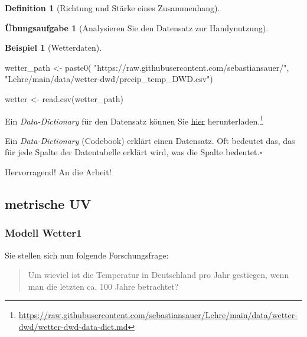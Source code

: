 \documentclass[
  a4paper,
  DIV=11]{scrreprt}
\newenvironment{Shaded}{\begin{snugshade}}{\end{snugshade}}
\newcommand{\FunctionTok}[1]{\textcolor[rgb]{0.28,0.35,0.67}{#1}}
\newcommand{\NormalTok}[1]{\textcolor[rgb]{0.00,0.23,0.31}{#1}}
\newcommand{\OtherTok}[1]{\textcolor[rgb]{0.00,0.23,0.31}{#1}}
\newcommand{\StringTok}[1]{\textcolor[rgb]{0.13,0.47,0.30}{#1}}
\theoremstyle{definition}
\newtheorem{exercise}{Übungsaufgabe}[chapter]
\theoremstyle{definition}
\newtheorem{example}{Beispiel}[chapter]
\theoremstyle{definition}
\newtheorem{definition}{Definition}[chapter]
\theoremstyle{remark}
\begin{document}
\begin{definition}[Richtung und Stärke eines
Zusammenhang]
\begin{exercise}[Analysieren Sie den Datensatz zur
Handynutzung]
\begin{example}[Wetterdaten]
\begin{Shaded}
\begin{Highlighting}[]
\NormalTok{wetter\_path }\OtherTok{\textless{}{-}} \FunctionTok{paste0}\NormalTok{(}
  \StringTok{"https://raw.githubusercontent.com/sebastiansauer/"}\NormalTok{,}
  \StringTok{"Lehre/main/data/wetter{-}dwd/precip\_temp\_DWD.csv"}\NormalTok{)}

\NormalTok{wetter }\OtherTok{\textless{}{-}} \FunctionTok{read.csv}\NormalTok{(wetter\_path)}
\end{Highlighting}
\end{Shaded}

Ein \emph{Data-Dictionary} für den Datensatz können Sie
\href{https://raw.githubusercontent.com/sebastiansauer/Lehre/main/data/wetter-dwd/wetter-dwd-data-dict.md}{hier}
herunterladen.\footnote{\url{https://raw.githubusercontent.com/sebastiansauer/Lehre/main/data/wetter-dwd/wetter-dwd-data-dict.md}}

\begin{tcolorbox}[enhanced jigsaw, leftrule=.75mm, opacitybacktitle=0.6, colback=white, colframe=quarto-callout-note-color-frame, coltitle=black, colbacktitle=quarto-callout-note-color!10!white, opacityback=0, left=2mm, breakable, titlerule=0mm, toptitle=1mm, bottomtitle=1mm, rightrule=.15mm, title=\textcolor{quarto-callout-note-color}{\faInfo}\hspace{0.5em}{Hinweis}, arc=.35mm, bottomrule=.15mm, toprule=.15mm]

Ein \emph{Data-Dictionary} (Codebook) erklärt einen Datensatz. Oft
bedeutet das, das für jede Spalte der Datentabelle erklärt wird, was die
Spalte bedeutet.\(\square\)

\end{tcolorbox}

Hervorragend! An die Arbeit!

\end{example}

\subsection{metrische UV}\label{metrische-uv}

\subsubsection{Modell Wetter1}\label{modell-wetter1}

Sie stellen sich nun folgende Forschungsfrage:

\begin{quote}
{} Um wieviel ist die Temperatur in Deutschland pro Jahr
gestiegen, wenn man die letzten ca. 100 Jahre betrachtet?
\end{quote}


\end{exercise}
\end{definition}
\end{document}
